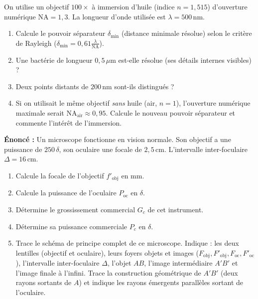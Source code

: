 \documentclass[11pt]{article}
\newcounter{popsec}
\newcounter{popsub}
\newcommand{\courssub}[1]{%
  \stepcounter{popsub}%
  \par\vspace{9pt}\noindent{\popxbold\fontsize{11.5}{13}\selectfont\color{popink}{\color{poporange}\thepopsec.\thepopsub}\hspace{6pt}#1}\par\nopagebreak\vspace{4pt}
}
\begin{document}
\begin{exercice}
On utilise un objectif $100\times$ à immersion d'huile (indice $n = 1,515$) d'ouverture numérique $\text{NA} = 1,3$. La longueur d'onde utilisée est $\lambda = 500\,\text{nm}$.
\begin{enumerate}
    \item Calcule le pouvoir séparateur $\delta_{\text{min}}$ (distance minimale résolue) selon le critère de Rayleigh ($\delta_{\text{min}} = 0,61 \frac{\lambda}{\text{NA}}$).
    \item Une bactérie de longueur $0,5\,\mu\text{m}$ est-elle résolue (ses détails internes visibles) ?
    \item Deux points distants de $200\,\text{nm}$ sont-ils distingués ?
    \item Si on utilisait le même objectif \emph{sans} huile (air, $n=1$), l'ouverture numérique maximale serait $\text{NA}_{\text{air}} \approx 0,95$. Calcule le nouveau pouvoir séparateur et commente l'intérêt de l'immersion.
\end{enumerate}
\end{exercice}

\courssub{Je me prépare au Probatoire}

\begin{exercice}
\textbf{Énoncé :} Un microscope fonctionne en vision normale. Son objectif a une puissance de $250\,\delta$, son oculaire une focale de $2,5\,\text{cm}$. L'intervalle inter-foculaire $\Delta = 16\,\text{cm}$.
\begin{enumerate}
    \item Calcule la focale de l'objectif $f'_{\text{obj}}$ en mm.
    \item Calcule la puissance de l'oculaire $P_{\text{oc}}$ en $\delta$.
    \item Détermine le grossissement commercial $G_c$ de cet instrument.
    \item Détermine sa puissance commerciale $P_c$ en $\delta$.
    \item Trace le schéma de principe complet de ce microscope. Indique : les deux lentilles (objectif et oculaire), leurs foyers objets et images ($F_{\text{obj}}, F'_{\text{obj}}, F_{\text{oc}}, F'_{\text{oc}}$), l'intervalle inter-foculaire $\Delta$, l'objet $AB$, l'image intermédiaire $A'B'$ et l'image finale à l'infini. Trace la construction géométrique de $A'B'$ (deux rayons sortants de $A$) et indique les rayons émergents parallèles sortant de l'oculaire.
\end{enumerate}
\end{exercice}
\end{document}
